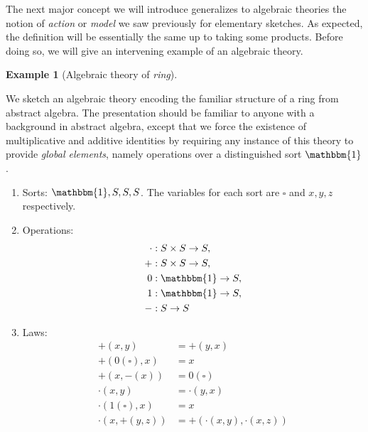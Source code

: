 \documentclass[12pt,twoside]{reedthesis}
\theoremstyle{definition}
\newtheorem{example}{Example}
\theoremstyle{remark}
\theoremstyle{theorem}
\begin{document}
The next major concept we will introduce generalizes to algebraic theories the
notion of \emph{action} or \emph{model} we saw previously for elementary
sketches. As expected, the definition will be essentially the same up to taking
some products. Before doing so, we will give an intervening example of an
algebraic theory.
\begin{example}[Algebraic theory of \emph{ring}]\label{ex:theory of ring}

  We sketch an algebraic theory encoding the familiar structure of a ring from
  abstract algebra. The presentation should be familiar to anyone with a
  background in abstract algebra, except that we force the existence of
  multiplicative and additive identities by requiring any instance of this
  theory to provide \emph{global elements}, namely operations over a
  distinguished sort $\mathbbm{1}$.
  \begin{enumerate}
    \item Sorts: \( \mathbbm{1}, S, S, S \). The variables for each sort are
          \( \square \) and \( x, y, z\) respectively.

    \item Operations: \begin{align*}
                        \cdot &: S \times S \rightarrow S, \\
                        + &: S \times S \rightarrow S,\\
                        0 &: \mathbbm{1} \rightarrow S,\\
                        1 &: \mathbbm{1} \rightarrow S,\\
                        - &: S \rightarrow S
                      \end{align*}

    \item Laws: \begin{align*}
                  +(x,y) &= +(y,x)\\
                  +(0(\square), x) &= x\\
                  +(x, -(x)) &= 0(\square)\\
                  \cdot(x,y) &= \cdot(y,x)\\
                  \cdot(1(\square), x) &= x\\
                  \cdot(x, +(y,z)) &= +(\cdot(x,y), \cdot(x,z))
                \end{align*}
  \end{enumerate}
\end{example}
\end{document}
